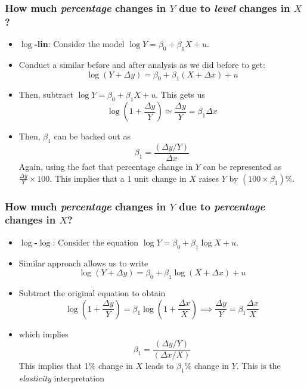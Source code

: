 \documentclass[aspectratio=169]{beamer}
\begin{document}
\begin{frame}
\frametitle{How much \textit{percentage} changes in $Y$ due to \textit{level} changes in $X$?}

\begin{itemize}
\item\textbf{$\log$-lin}: Consider the model $\log{Y}=\beta_0 + \beta_1 X+u$. 
\item Conduct a similar before and after analysis as we did before to get:
\[
\log(Y+\Delta y) = \beta_0 + \beta_1(X+\Delta x)+u
\]
\item Then, subtract $\log{Y}=\beta_0 + \beta_1 X+u$. This gets us
\[
\log\left(1+\frac{\Delta y}{Y}\right)\simeq \frac{\Delta y}{Y} = \beta_1 \Delta x
\]
\item Then, $\beta_1$ can be backed out as
\[
\beta_1 = \frac{(\Delta y / Y)}{\Delta x}
\]
Again, using the fact that percentage change in $Y$ can be represented as $\frac{\Delta y}{Y}\times 100$. This implies that a 1 unit change in $X$ raises $Y$ by $(100\times \beta_1)\%$. 
\end{itemize}
\end{frame}

\begin{frame}
\frametitle{How much \textit{percentage} changes in $Y$ due to \textit{percentage} changes in $X$?}
\begin{itemize}
\item\textbf{$\log$-$\log$}: Consider the equation $\log{Y} = \beta_0 + \beta_1\log{X}+u$. 
\item Similar approach allows us to write
\[
\log(Y+\Delta y) = \beta_0 + \beta_1 \log(X+\Delta x)+u
\]
\item Subtract the original equation to obtain
\[
\log\left(1+\frac{\Delta y}{Y}\right)=\beta_1\log\left(1+\frac{\Delta x}{X}\right) \implies \frac{\Delta y}{Y}=\beta_1\frac{\Delta x}{X}
\]
\item which implies 
\[
\beta_1 = \frac{(\Delta y/Y)}{(\Delta x/X)}
\]
This implies that 1\% change in $X$ leads to $\beta_1\%$ change in $Y$. This is the \textit{elasticity} interpretation
\end{itemize}
\end{frame}
\end{document}
